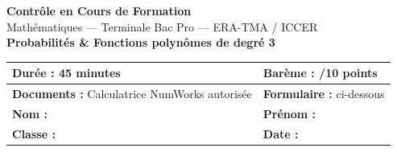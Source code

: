 \documentclass[a4paper,11pt]{article}
\begin{document}
\begin{center}
{\LARGE\bfseries\color{bleupro} Contrôle en Cours de Formation}\\[8pt]
{\large Mathématiques — Terminale Bac Pro — ERA-TMA / ICCER}\\[12pt]
{\Large\bfseries Probabilités \& Fonctions polynômes de degré 3}\\[20pt]

\begin{tabular}{|p{6cm}|p{6cm}|}
\hline
\textbf{Durée :} 45 minutes & \textbf{Barème :} /10 points \\
\hline
\textbf{Documents :} Calculatrice NumWorks autorisée & \textbf{Formulaire :} ci-dessous \\
\hline
\textbf{Nom :} \dotfill & \textbf{Prénom :} \dotfill \\
\hline
\textbf{Classe :} \dotfill & \textbf{Date :} \dotfill \\
\hline
\end{tabular}
\end{center}

\vspace{10pt}
\end{document}
